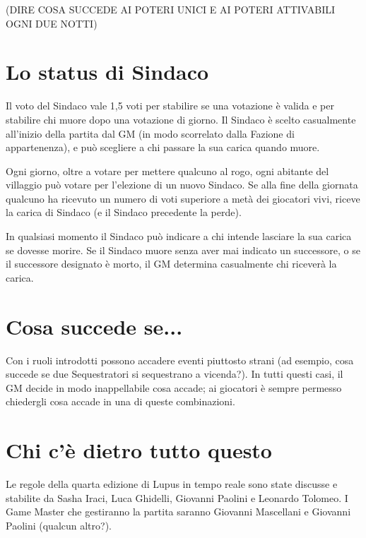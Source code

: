 \documentclass[a4paper,10pt]{article}
\begin{document}
(DIRE COSA SUCCEDE AI POTERI UNICI E AI POTERI ATTIVABILI OGNI DUE NOTTI)


\section{Lo status di Sindaco}

Il voto del Sindaco vale 1,5 voti per stabilire se una votazione è valida e per stabilire chi muore dopo una votazione di giorno.
Il Sindaco è scelto casualmente all'inizio della partita dal GM (in modo scorrelato dalla Fazione di appartenenza), e può scegliere a chi passare la sua carica quando muore.

Ogni giorno, oltre a votare per mettere qualcuno al rogo, ogni abitante del villaggio può votare per l'elezione di un nuovo Sindaco. Se alla fine della giornata qualcuno ha ricevuto un numero di voti superiore a metà dei giocatori vivi, riceve la carica di Sindaco (e il Sindaco precedente la perde).

In qualsiasi momento il Sindaco può indicare a chi intende lasciare la sua carica se dovesse morire. Se il Sindaco muore senza aver mai indicato un successore, o se il successore designato è morto, il GM determina casualmente chi riceverà la carica.


\section{Cosa succede se...}

Con i ruoli introdotti possono accadere eventi piuttosto strani (ad esempio, cosa succede se due Sequestratori si sequestrano a vicenda?). In tutti questi casi, il GM decide in modo inappellabile cosa accade; ai giocatori è sempre permesso chiedergli cosa accade in una di queste combinazioni.


\section{Chi c'è dietro tutto questo}

Le regole della quarta edizione di Lupus in tempo reale sono state discusse e stabilite da Sasha Iraci, Luca Ghidelli, Giovanni Paolini e Leonardo Tolomeo.
I Game Master che gestiranno la partita saranno Giovanni Mascellani e Giovanni Paolini (qualcun altro?).
\end{document}
